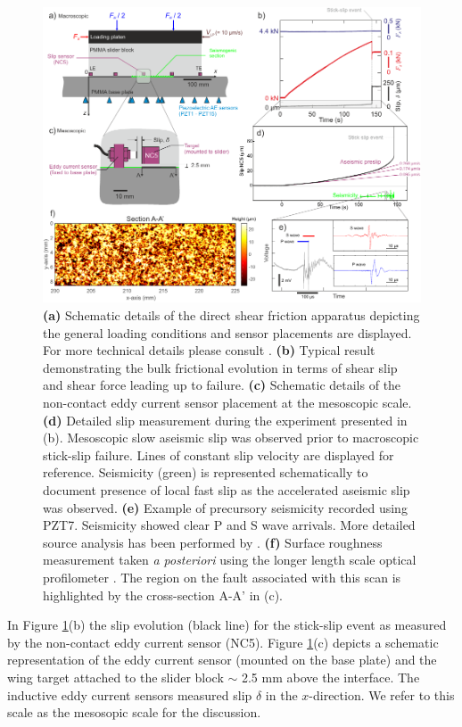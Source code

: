 \documentclass[preprint,1p, 10pt,authoryear]{elsarticle}
\begin{document}
\begin{figure}
 	\centering
 	\includegraphics{FIG1_revised.pdf} 
 	\caption{ \textbf{(a)} Schematic details of the direct shear friction apparatus depicting the general loading conditions and sensor placements are displayed. For more technical details please consult \citet{Selvadurai2015, Selvadurai2015a}. \textbf{(b)} Typical result demonstrating the bulk frictional evolution in terms of shear slip and shear force leading up to failure. \textbf{(c)} Schematic details of the non-contact eddy current sensor placement at the mesoscopic scale. \textbf{(d)} Detailed slip measurement during the experiment presented in (b).  Mesoscopic slow aseismic slip was observed prior to macroscopic stick-slip failure.  Lines of constant slip velocity are displayed for reference.  Seismicity (green) is represented schematically to document presence of local fast slip as the accelerated aseismic slip was observed. \textbf{(e)}  Example of precursory seismicity recorded using PZT7.  Seismicity showed clear P and S wave arrivals. More detailed source analysis has been performed by \citet{Selvadurai2019}. \textbf{(f)} Surface roughness measurement taken \textit{a posteriori} using the longer length scale optical profilometer \citep{Selvadurai2017}.  The region on the fault associated with this scan is highlighted by the cross-section A-A’ in (c).}
 	\label{fig1}
 \end{figure}
In Figure \ref{fig1}(b) the slip evolution (black line) for the stick-slip event as measured by the non-contact eddy current sensor (NC5).  Figure \ref{fig1}(c) depicts a schematic representation of the eddy current sensor (mounted on the base plate) and the wing target attached to the slider block $\sim$ 2.5 mm above the interface.  The inductive eddy current sensors measured slip $\delta$ in the $x$-direction. We refer to this scale as the mesosopic scale for the discussion.
 
\end{document}
